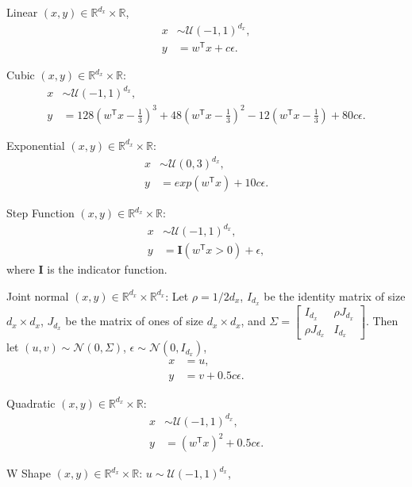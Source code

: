 \documentclass[11pt]{article}
\providecommand{\mb}[1]{\boldsymbol{#1}}
\providecommand{\mc}[1]{\mathcal{#1}}
\newcommand{\Real}{\mathbb{R}}
\newcommand{\T}{^{\ensuremath{\mathsf{T}}}}           %
\begin{document}
\setcounter{equation}{0}
\begin{compactenum}
\item Linear $(x,y) \in \Real^{d_{x}} \times \Real$,  
\begin{align*}
x &\sim \mc{U}(-1,1)^{d_{x}},\\
y &=w\T x+c\epsilon.
\end{align*}
\item Cubic $(x,y) \in \Real^{d_{x}} \times \Real$: 
\begin{align*}
x &\sim \mc{U}(-1,1)^{d_{x}}, \\ 
y &=128(w\T x-\tfrac{1}{3})^3+48(w\T x-\tfrac{1}{3})^2-12(w\T x-\tfrac{1}{3})+80c\epsilon.
\end{align*}
\item Exponential $(x,y) \in \Real^{d_{x}} \times \Real$: 
\begin{align*}
x &\sim \mc{U}(0,3)^{d_{x}}, \\
y &=exp(w\T x)+10c\epsilon.
\end{align*}
\item Step Function $(x,y) \in \Real^{d_{x}} \times \Real$: 
\begin{align*}
x &\sim \mc{U}(-1,1)^{d_{x}},\\ 
y &=\mb{I}(w\T x>0)+\epsilon,
\end{align*}
where $\mb{I}$ is the indicator function. 
\item Joint normal $(x,y) \in \Real^{d_{x}} \times \Real^{d_{x}}$: Let $\rho=1/2d_{x}$, $I_{d_{x}}$ be the identity matrix of size $d_{x} \times d_{x}$, $J_{d_{x}}$ be the matrix of ones of size $d_{x} \times d_{x}$, and $\Sigma = \begin{bmatrix} I_{d_{x}}&\rho J_{d_{x}}\\ \rho J_{d_{x}}&I_{d_{x}} \end{bmatrix}$. Then let $(u,v) \sim \mc{N}(0, \Sigma)$, $\epsilon \sim \mc{N}(0, I_{d_{x}})$,
\begin{align*}
x &=u,\\ 
y &=v+0.5c\epsilon.
\end{align*}
\item Quadratic $(x,y) \in \Real^{d_{x}} \times \Real$: 
\begin{align*}
x &\sim \mc{U}(-1,1)^{d_{x}},\\
y&=(w\T x)^2+0.5c\epsilon.
\end{align*}
\item W Shape $(x,y) \in \Real^{d_{x}} \times \Real$:  $u \sim \mc{U}(-1,1)^{d_{x}}$,
\begin{align*}

\end{align*}
\end{compactenum}
\end{document}
